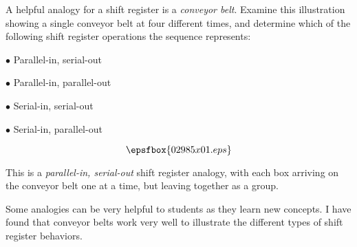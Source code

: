 

A helpful analogy for a shift register is a {\it conveyor belt}.  Examine this illustration showing a single conveyor belt at four different times, and determine which of the following shift register operations the sequence represents:

\medskip
\item{$\bullet$} Parallel-in, serial-out
\item{$\bullet$} Parallel-in, parallel-out
\item{$\bullet$} Serial-in, serial-out
\item{$\bullet$} Serial-in, parallel-out
\medskip

$$\epsfbox{02985x01.eps}$$







This is a {\it parallel-in, serial-out} shift register analogy, with each box arriving on the conveyor belt one at a time, but leaving together as a group.







Some analogies can be very helpful to students as they learn new concepts.  I have found that conveyor belts work very well to illustrate the different types of shift register behaviors.





